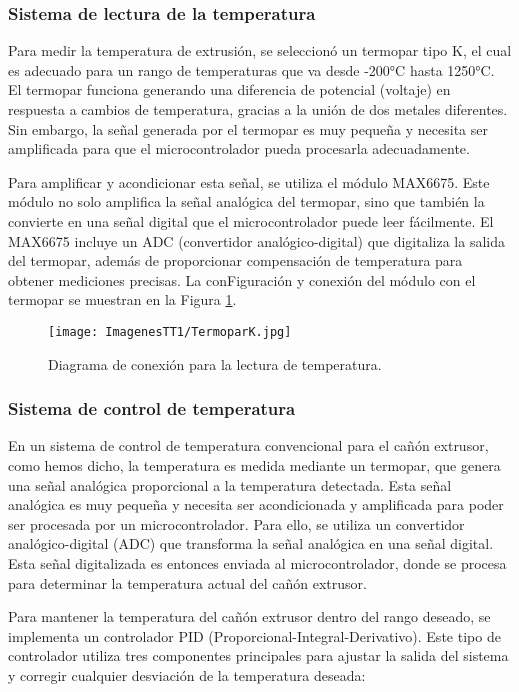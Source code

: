 \documentclass[14pt,oneside]{extarticle} %
\begin{document}
\subsubsection{Sistema de lectura de la temperatura}

Para medir la temperatura de extrusión, se seleccionó un termopar tipo K, el cual es adecuado para un rango de temperaturas que va desde -200°C hasta 1250°C. El termopar funciona generando una diferencia de potencial (voltaje) en respuesta a cambios de temperatura, gracias a la unión de dos metales diferentes. Sin embargo, la señal generada por el termopar es muy pequeña y necesita ser amplificada para que el microcontrolador pueda procesarla adecuadamente.

Para amplificar y acondicionar esta señal, se utiliza el módulo MAX6675. Este módulo no solo amplifica la señal analógica del termopar, sino que también la convierte en una señal digital que el microcontrolador puede leer fácilmente. El MAX6675 incluye un ADC (convertidor analógico-digital) que digitaliza la salida del termopar, además de proporcionar compensación de temperatura para obtener mediciones precisas. La conFiguración y conexión del módulo con el termopar se muestran en la Figura \ref{fig:thermocouple_circuit}.

\begin{figure}[h!]
    \centering
    \texttt{[image: ImagenesTT1/TermoparK.jpg]}
    \caption{Diagrama de conexión para la lectura de temperatura.}
    \label{fig:thermocouple_circuit}
\end{figure}

\newpage
\subsubsection{Sistema de control de temperatura}

En un sistema de control de temperatura convencional para el cañón extrusor, como hemos dicho, la temperatura es medida mediante un termopar, que genera una señal analógica proporcional a la temperatura detectada. Esta señal analógica es muy pequeña y necesita ser acondicionada y amplificada para poder ser procesada por un microcontrolador. Para ello, se utiliza un convertidor analógico-digital (ADC) que transforma la señal analógica en una señal digital. Esta señal digitalizada es entonces enviada al microcontrolador, donde se procesa para determinar la temperatura actual del cañón extrusor.

Para mantener la temperatura del cañón extrusor dentro del rango deseado, se implementa un controlador PID (Proporcional-Integral-Derivativo). Este tipo de controlador utiliza tres componentes principales para ajustar la salida del sistema y corregir cualquier desviación de la temperatura deseada:
\end{document}
